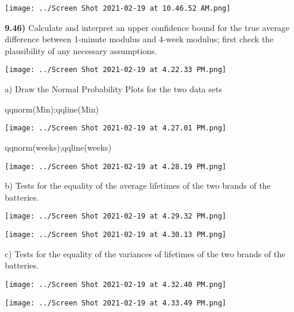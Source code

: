 \documentclass{article}
\begin{document}
\vspace{3mm}



\texttt{[image: ../Screen Shot 2021-02-19 at 10.46.52 AM.png]} 



 \newpage

\textbf{9.46)} Calculate and interpret an upper confidence bound for the true average difference between 1-minute modulus and 4-week modulus; first check the plausibility of any necessary assumptions.

\vspace{2mm}

\texttt{[image: ../Screen Shot 2021-02-19 at 4.22.33 PM.png]} 


\vspace{3mm}

a)	 Draw the Normal Probability Plots for the two data sets

\vspace{2mm}


qqnorm(Min);qqline(Min)

\vspace{2mm}


\texttt{[image: ../Screen Shot 2021-02-19 at 4.27.01 PM.png]}


\vspace{4mm}

\newpage

qqnorm(weeks);qqline(weeks)

\vspace{2mm}

\texttt{[image: ../Screen Shot 2021-02-19 at 4.28.19 PM.png]}

\vspace{4mm}


b)	Tests for the equality of the average lifetimes of the two brands of the batteries.

\vspace{2mm}

\texttt{[image: ../Screen Shot 2021-02-19 at 4.29.32 PM.png]}

\vspace{2mm}

\texttt{[image: ../Screen Shot 2021-02-19 at 4.30.13 PM.png]}

\vspace{4mm}


\newpage
c)	Tests for the equality of the variances of  lifetimes of the two brands of the batteries.

\vspace{3mm}

\texttt{[image: ../Screen Shot 2021-02-19 at 4.32.40 PM.png]}

\vspace{3mm}

\texttt{[image: ../Screen Shot 2021-02-19 at 4.33.49 PM.png]}
\end{document}
